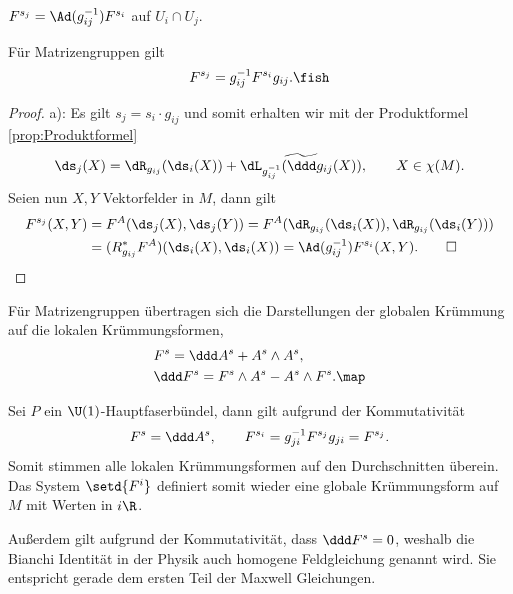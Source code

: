 \documentclass[%
	paper=a5,%
	fleqn,%
	DIV=18,%
	BCOR=0mm,
	fontsize=11pt,
	titlepage=false,%
	bibliography=totoc,
	DIV=18,%
	twoside=true,
	pdftitle=Riemannsche Geometrie,
	pdfauthor=Uwe Semmelmann,
	numbers=noendperiod]%
	{scrbook}
\begin{document}
\begin{lem}
\begin{propenum}
\item $F^{s_j} = \Ad(g_{ij}^{-1})F^{s_i}$ auf $U_i\cap U_j$.
\item Für Matrizengruppen gilt
\begin{align*}
F^{s_j} = g_{ij}^{-1}F^{s_i}g_{ij}.\fish
\end{align*}
\end{propenum}
\end{lem}
\begin{proof}
a): Es gilt $s_j = s_i\cdot g_{ij}$ und somit erhalten wir mit der Produktformel
\ref{prop:Produktformel}
\begin{align*}
\ds_j(X) = \dR_{g_{ij}}(\ds_i(X)) + \widetilde{\dL_{g_{ij}^{-1}}(\ddd
g_{ij}(X))},\qquad X\in\chi(M).
\end{align*}
Seien nun $X,Y$ Vektorfelder in $M$, dann gilt
\begin{align*}
F^{s_j}(X,Y) &= F^A(\ds_j(X),\ds_j(Y))
= F^A(\dR_{g_{ij}}(\ds_i(X)),\dR_{g_{ij}}(\ds_i(Y)))\\
&= (R_{g_{ij}}^* F^A)(\ds_i(X),\ds_i(X)) =
\Ad(g_{ij}^{-1})F^{s_i}(X,Y).\qed
\end{align*}
\end{proof}

\begin{rem}
Für Matrizengruppen übertragen sich die Darstellungen der globalen Krümmung auf
die lokalen Krümmungsformen,
\begin{align*}
&F^s = \ddd A^s + A^s\wedge A^s,\\
&\ddd F^s = F^s\wedge A^s - A^s \wedge F^s.\map
\end{align*}
\end{rem}

\begin{ex}
Sei $P$ ein $\U(1)$-Hauptfaserbündel, dann gilt aufgrund der Kommutativität
\begin{align*}
F^s = \ddd A^s,\qquad
F^{s_i} = g_{ji}^{-1}F^{s_j}g_{ji} = F^{s_j}.
\end{align*}
Somit stimmen alle lokalen Krümmungsformen auf den Durchschnitten überein. Das
System $\setd{F^i}$ definiert somit wieder eine globale Krümmungsform auf $M$
mit Werten in $i\R$.

Außerdem gilt aufgrund der Kommutativität, dass $\ddd F^s = 0$, weshalb die
Bianchi Identität in der Physik auch homogene Feldgleichung genannt wird. Sie
entspricht gerade dem ersten Teil der Maxwell Gleichungen.\boxc
\end{ex}
\end{document}

